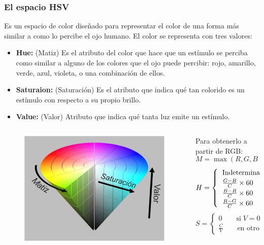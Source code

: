 \begin{frame}\frametitle{El espacio HSV}
  Es un espacio de color diseñado para representar el color de una forma más similar a como lo percibe el ojo humano. El color se representa con tres valores:
  \begin{itemize}
  \item \textbf{Hue:} (Matiz) Es el atributo del color que hace que un estímulo se perciba como similar a alguno de los colores que el ojo puede percibir: rojo, amarillo, verde, azul, violeta, o una combinación de ellos.
  \item \textbf{Saturaion: } (Saturación) Es el atributo que indica qué tan colorido es un estímulo con respecto a su propio brillo.
  \item \textbf{Value: } (Valor) Atributo que indica qué tanta luz emite un estímulo. 
  \end{itemize}
  \begin{columns}
    \begin{column}{0.35\textwidth}
      \begin{figure}
        \centering
        \includegraphics[width=\textwidth]{Figures/hsv_space.pdf}
      \end{figure}
    \end{column}
    \begin{column}{0.65\textwidth}
      Para obtenerlo a partir de RGB:
      \[M = \max(R,G,B)\qquad m=\min(R,G,B)\qquad C=M - m\]
      \[H = \begin{cases}\begin{tabular}{lcl}Indeterminado & si & C=0 \\ $\frac{G-B}{C}\times 60$ & si & M = R \\ $\frac{B - R}{C}\times 60$ & si & M = G \\ $\frac{R - G}{C}\times 60$ & si & M = B\end{tabular}\end{cases}\qquad V = M\]
      \[S = \begin{cases}0\qquad \textrm{si}\; V=0\\ \frac{C}{V}\qquad \textrm{en otro caso}\end{cases}\]
    \end{column}
  \end{columns}
\end{frame}

